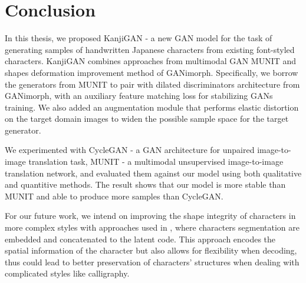 \documentclass[12pt]{report}
\begin{document}
\chapter{Conclusion}
\label{chap:conclusion}

In this thesis, we proposed KanjiGAN - a new GAN model for the task of generating samples of handwritten Japanese characters from existing font-styled characters. KanjiGAN combines approaches from multimodal GAN MUNIT\cite{munit} and shapes deformation improvement method of GANimorph\cite{ganimorph}. Specifically, we borrow the generators from MUNIT to pair with dilated discriminators architecture from GANimorph, with an auxiliary feature matching loss for stabilizing GANs training. We also added an augmentation module that performs elastic distortion on the target domain images to widen the possible sample space for the target generator.

We experimented with CycleGAN - a GAN architecture for unpaired image-to-image translation task, MUNIT - a multimodal unsupervised image-to-image translation network, and evaluated them against our model using both qualitative and quantitive methods. The result shows that our model is more stable than MUNIT and able to produce more samples than CycleGAN.

For our future work, we intend on improving the shape integrity of characters in more complex styles with approaches used in \cite{dense-ran}\cite{calligan}, where characters segmentation are embedded and concatenated to the latent code. This approach encodes the spatial information of the character but also allows for flexibility when decoding, thus could lead to better preservation of characters' structures when dealing with complicated styles like calligraphy.
\end{document}
